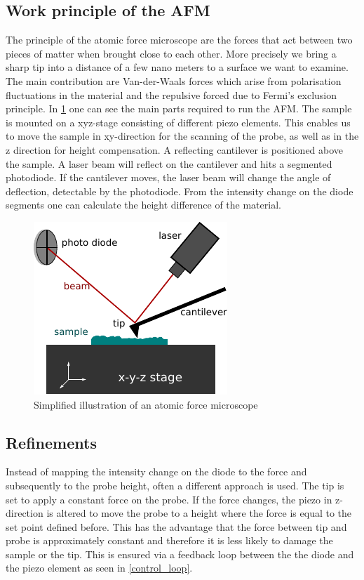 \documentclass[paper=a4,fontsize=10pt,DIV=18,twocolumn,parskip=half]{scrartcl}
\numberwithin{equation}{section}    %
\begin{document}
\subsection{Work principle of the AFM}
The principle of the atomic force microscope are the forces that act between two 
pieces of matter when brought close to each other. More precisely we bring a 
sharp tip into a distance of a few nano meters to  a surface we want to examine.  
The main contribution are Van-der-Waals forces which arise from 
polarisation fluctuations in the material and the repulsive forced due to 
Fermi's exclusion principle.
In \cref{afm_scheme} one can see the main parts required to run the AFM. 
The sample is mounted on a xyz-stage consisting of different piezo elements. 
This enables us to move the sample in xy-direction for the scanning of the 
probe, as well as in the z direction for height compensation. A reflecting 
cantilever is positioned above the sample. A laser beam will reflect on the 
cantilever and hits a segmented photodiode. If the cantilever moves, the 
laser beam will change the angle of deflection, detectable by the photodiode.
From the intensity change on the diode segments one can calculate the height 
difference of the material.

\begin{figure}
    \centering
    \includegraphics{Bilder/afm_scheme.pdf}
    \caption{Simplified illustration of an atomic force microscope}
    \label{afm_scheme}
\end{figure}

\subsection{Refinements}
Instead of mapping the intensity change on the diode to the force and 
subsequently to the probe height, often a different approach is used. The tip is 
set to apply a constant force on the probe. If the force changes, the piezo in 
z-direction is altered to move the probe to a height where the force is equal to 
the set point defined before. This has the advantage that the force between tip 
and probe is approximately constant and therefore it is less likely to damage 
the sample or the tip. This is ensured via a feedback loop between the the diode 
and the piezo element as seen in \cref{control_loop}.
\end{document}
